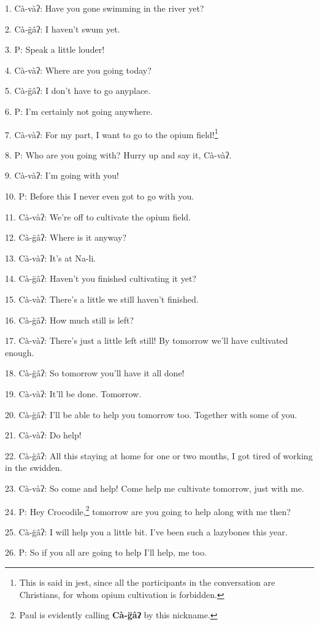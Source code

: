 \setcounter{footnote}{0}

1. Cà-vàʔ: Have you gone swimming in the river yet?

2. Cà-g̈âʔ: I haven't swum yet.

3. P: Speak a little louder!

4. Cà-vàʔ: Where are you going today?

5. Cà-g̈âʔ: I don't have to go anyplace.

6. P: I'm certainly not going anywhere.

7. Cà-vàʔ: For my part, I want to go to the opium field!\footnote{This is said in jest, since all the participants in the conversation are Christians, for whom opium cultivation is forbidden.}

8. P: Who are you going with? Hurry up and say it, Cà-vàʔ.

9. Cà-vàʔ: I'm going with you!

10. P: Before this I never even got to go with you.

11. Cà-vàʔ: We're off to cultivate the opium field.

12. Cà-g̈âʔ: Where is it anyway?

13. Cà-vàʔ: It's at Na-li.

14. Cà-g̈âʔ: Haven't you finished cultivating it yet?

15. Cà-vàʔ: There's a little we still haven't finished.

16. Cà-g̈âʔ: How much still is left?

17. Cà-vàʔ: There's just a little left still! By tomorrow we'll have cultivated
enough.

18. Cà-g̈âʔ: So tomorrow you'll have it all done!

19. Cà-vàʔ: It'll be done. Tomorrow.

20. Cà-g̈âʔ: I'll be able to help you tomorrow too. Together with some of you.

21. Cà-vàʔ: Do help!

22. Cà-g̈âʔ: All this staying at home for one or two months, I got tired of
working in the swidden.

23. Cà-vàʔ: So come and help! Come help me cultivate tomorrow, just with me.

24. P: Hey Crocodile,\footnote{Paul is evidently calling \textbf{Cà-g̈âʔ} by this nickname.} tomorrow are you going to help along with me then?

25. Cà-g̈âʔ: I will help you a little bit. I've been such a lazybones this year.

26. P: So if you all are going to help I'll help, me too.

